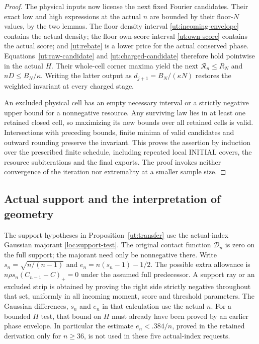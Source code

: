 \documentclass[aop,preprint]{imsart}
\theoremstyle{definition}
\numberwithin{equation}{section}
\begin{document}
\begin{proof}
The physical inputs now license the next fixed Fourier candidates.
Their exact low and high expressions at the actual $n$ are bounded
by their floor-$N$ values, by the two lemmas. The floor density
interval \eqref{ut:incoming-envelope} contains the actual density;
the floor own-score interval \eqref{ut:own-score} contains the
actual score; and \eqref{ut:rebate} is a lower price for the actual
conserved phase. Equations~\eqref{ut:raw-candidate} and
\eqref{ut:charged-candidate} therefore hold pointwise in the actual
$H$. Their whole-cell corner maxima yield the next
$\mathcal R_n\le R_N$ and $nD\le B_N/\kappa$.
Writing the latter output as $d_{j+1}=B_N/(\kappa N)$ restores the
weighted invariant at every charged stage.

An excluded physical cell has an empty necessary interval or a
strictly negative upper bound for a nonnegative resource.
Any surviving law lies in at least one retained closed cell, so
maximizing its new bounds over all retained cells is valid.
Intersections with preceding bounds, finite minima of valid
candidates and outward rounding preserve the invariant.
This proves the assertion by induction over the prescribed finite
schedule, including repeated local INITIAL covers, the resource
subiterations and the final exports. The proof invokes neither
convergence of the iteration nor extremality at a smaller sample size.
\end{proof}

\subsection{Actual support and the interpretation of geometry}

The support hypotheses in Proposition~\ref{ut:transfer} use the
actual-index Gaussian majorant \eqref{loc:support-test}.
The original contact function $\mathcal D_n$ is zero on the full
support; the majorant need only be nonnegative there.
Write $s_n=\sqrt{n/(n-1)}$ and $e_n=n(s_n-1)-1/2$.
The possible extra allowance is
$n\rho s_n(C_{n-1}-C)_+=0$ under the assumed full predecessor.
A support ray or an excluded strip is obtained by proving the right
side strictly negative throughout that set, uniformly in all incoming
moment, score and threshold parameters. The Gaussian differences,
$s_n$ and $e_n$ in that calculation use the actual $n$.
For a bounded $H$ test, that bound on $H$ must already have been
proved by an earlier phase envelope. In particular the estimate
$e_n<.384/n$, proved in the retained derivation only for $n\ge36$,
is not used in these five actual-index requests.
\end{document}
